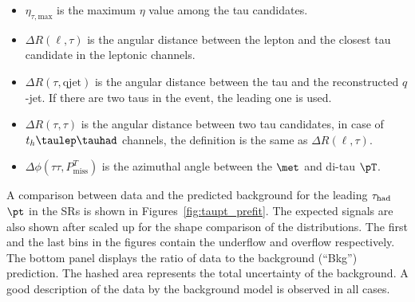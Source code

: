 \begin{itemize}
\item $\eta_{\tau,\text{max}}$ is the maximum $\eta$ value among the tau candidates.
\item $\Delta R(\ell,\tau)$ is the angular distance between the lepton and the closest tau candidate in the leptonic channels.
\item $\Delta R(\tau,\text{qjet})$ is the angular distance between the tau and the reconstructed $q$-jet. If there are two taus in the event, the leading one is used.
\item $\Delta R(\tau,\tau)$ is the angular distance between two tau candidates, in case of $t_h\tlhad$ channels, the definition is the same as $\Delta R(\ell,\tau)$.
\item $\Delta\phi(\tau\tau,P^{T}_{\text{miss}})$ is the azimuthal angle between the $\met$ and di-tau $\pT$.
\end{itemize}
A comparison between data and the predicted background for the leading $\tau_{\mathrm{had}}$ $\pt$ in the SRs 
is shown in Figures~\ref{fig:taupt_prefit}.
The expected signals are also shown after scaled up for the shape comparison of the distributions.
The first and the last bins in the figures contain the underflow and overflow respectively.
The bottom panel displays the ratio of data to the background (``Bkg'') prediction.
The hashed area represents the total uncertainty of the background.
A good description of the data by the background model is observed in all cases.

